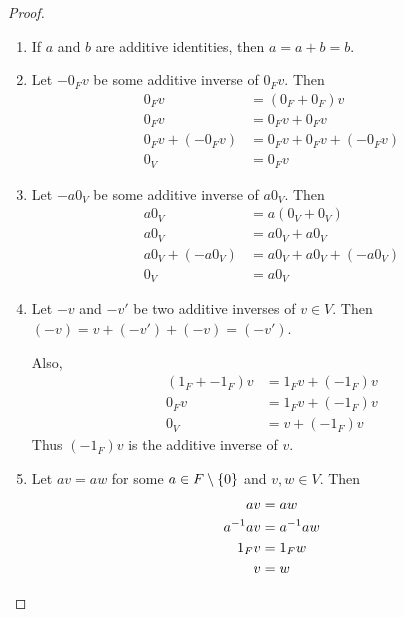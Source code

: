 \begin{proof} \leavevmode
    \begin{enumerate}[label=(\alph*)]
        \item If $a$ and $b$ are additive identities, then $a = a + b = b$.
        \item Let $-0_{F} v$ be some additive inverse of $0_{F} v$.
        Then
        \begin{align*}
            0_{F} v &= (0_{F} + 0_{F}) v \\
            0_{F} v &= 0_{F} v + 0_{F} v \\
            0_{F} v + (-0_{F} v) &= 0_{F} v + 0_{F} v + (-0_{F} v) \\
            0_{V} &= 0_{F} v
        \end{align*}
        \item Let $-a 0_{V}$ be some additive inverse of $a 0_{V}$.
        Then
        \begin{align*}
            a 0_{V} &= a (0_{V} + 0_{V}) \\
            a 0_{V} &= a 0_{V} + a 0_{V} \\
            a 0_{V} + (-a 0_{V}) &= a 0_{V} + a 0_{V} + (-a 0_{V}) \\
            0_{V} &= a 0_{V}
        \end{align*}
        \item Let $-v$ and $-v'$ be two additive inverses of $v \in V$.
        Then $(-v) = v + (-v') + (-v) = (-v')$.

        Also,
        \begin{align*}
            (1_{F} + -1_{F}) v &= 1_{F} v + (-1_{F}) v \\
            0_{F} v &= 1_{F} v + (-1_{F}) v \\
            0_{V} &= v + (-1_{F}) v
        \end{align*}
        Thus $(-1_{F}) v$ is the additive inverse of $v$.
        \item Let $a v = a w$ for some $a \in F \setminus\set{0}$ and $v, w \in V$.
        Then
        \begin{align*}
            a v &= a w \\
            a^{-1} a v &= a^{-1} a w \\
            1_{F} v &= 1_{F} w \\
            v &= w \qedhere
        \end{align*}
    \end{enumerate}
\end{proof}

